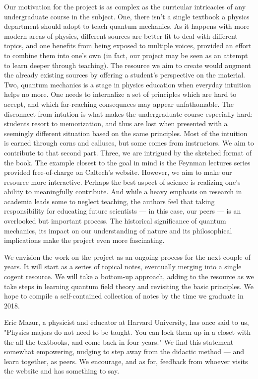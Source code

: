 \documentclass[paper=letterpaper, fontsize=11pt]{article} %
\numberwithin{equation}{section} %
\numberwithin{figure}{section} %
\numberwithin{table}{section} %
\begin{document}
\par Our motivation for the project is as complex as the curricular intricacies of any undergraduate course in the subject. One, there isn't a single textbook a physics department should adopt to teach quantum mechanics. As it happens with more modern areas of physics, different sources are better fit to deal with different topics, and one benefits from being exposed to multiple voices, provided an effort to combine them into one's own (in fact, our project may be seen as an attempt to learn deeper through teaching). The resource we aim to create would augment the already existing sources by offering a student's perspective on the material. Two, quantum mechanics is a stage in physics education when everyday intuition helps no more. One needs to internalize a set of principles which are hard to accept, and which far-reaching consequnces may appear unfathomable. The disconnect from intution is what makes the undergraduate course especially hard: students resort to memorization, and thus are lost when presented with a seemingly different situation based on the same principles. Most of the intuition is earned through corns and calluses, but some comes from instructors. We aim to contribute to that second part. Three, we are intrigued by the sketched format of the book. The example closest to the goal in mind is the Feynman lectures series provided free-of-charge on Caltech's website. However, we aim to make our resource more interactive.
Perhaps the best aspect of science is realizing one's ability to meaningfully contribute. And while a heavy emphasis on research in academia leads some to neglect teaching, the authors feel that taking responsibility for educating future scientists --- in this case, our peers --- is an overlooked but important process. The historical significance of quantum mechanics, its impact on our understanding of nature and its philosophical implications make the project even more fascinating.

\par We envision the work on the project as an ongoing process for the next couple of years. It will start as a series of topical notes, eventually merging into a single cogent resource. We will take a bottom-up approach, adding to the resource as we take steps in learning quantum field theory and revisiting the basic principles. We hope to compile a self-contained collection of notes by the time we graduate in 2018.

\par Eric Mazur, a physicist and educator at Harvard University, has once said to us, "Physics majors do not need to be taught. You can lock them up in a closet with the all the textbooks, and come back in four years." We find this statement somewhat empowering, nudging to step away from the didactic method --- and learn together, as peers. We encourage, and as for, feedback from whoever visits the website and has something to say. 
\end{document}
